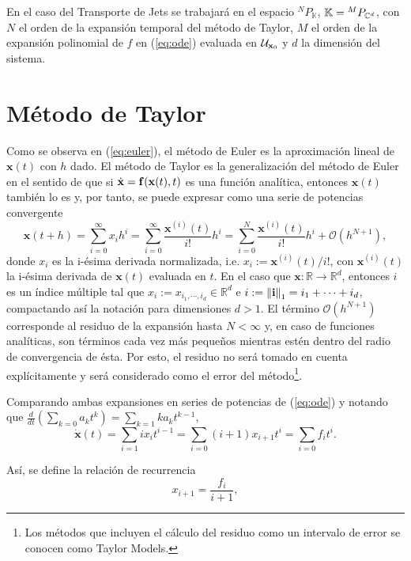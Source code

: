 En el caso del Transporte de Jets se trabajará en el espacio ${^{N}P_{\mathbb{K}}}$, $\mathbb{K} = {^{M}P_{\mathbb{C}^ d} }$, con $N$ el orden de la expansión temporal del método de Taylor, $M$ el orden de la expansión polinomial de $f$ en (\ref{eq:ode}) evaluada en $\mathcal{U}_{\mathbf{x}_0}$ y $d$ la dimensión del sistema. 

\section{Método de Taylor}
\label{sec:taylor-metodo}

Como se observa en (\ref{eq:euler}), el método de Euler es la aproximación lineal de $\mathbf{x}(t)$ con $h$ dado. El método de Taylor es la generalización del método de Euler en el sentido de que si $\dot{\mathbf{x}} = \mathbf{f}(\mathbf{x}(t),t)$ es una función analítica, entonces $\mathbf{x}(t)$ también lo es y, por tanto, se puede expresar como una serie de potencias convergente 
\begin{equation}
\mathbf{x}(t + h) = \sum_{i=0}^\infty x_i h^i = \sum_{i=0}^\infty \frac{\mathbf{x}^{(i)}(t)}{i!}h^i 
= \sum_{i=0}^N \frac{\mathbf{x}^{(i)}(t)}{i!}h^i + \mathcal{O}(h^{N+1}),
\label{eq:anal-exp}
\end{equation}
donde $x_i$ es la i-ésima derivada normalizada, i.e. $x_i  := \mathbf{x}^{(i)}(t)/i! $, con $\mathbf{x}^{(i)}(t)$ la i-ésima derivada de $\mathbf{x}(t)$ evaluada en $t$. En el caso que $\mathbf{x}: \mathbb{R} \to \mathbb{R}^d$, entonces $i$ es un índice múltiple tal que $x_i := x_{i_1,\cdots,i_d} \in \mathbb{R}^d$ e $i :=\left\lVert\mathbf{i}\right\rVert_1 = i_1 + \cdots + i_d$, compactando así la notación para dimensiones $d > 1$. El término $\mathcal{O}(h^{N+1})$ corresponde al residuo de la expansión hasta $N < \infty$ y, en caso de funciones analíticas, son términos cada vez más pequeños mientras estén dentro del radio de convergencia de ésta. Por esto, el residuo no será tomado en cuenta explícitamente y será considerado como el error del método\footnote{Los métodos que incluyen el cálculo del residuo como un intervalo de error se conocen como Taylor Models.}.

Comparando ambas expansiones en series de potencias de (\ref{eq:ode}) y notando que $ \frac{d}{dt} \left( \sum_{k=0} a_k t^k \right) = \sum_{k=1} k a_k t^{k-1}$,   
\begin{equation*}
 \dot{\mathbf{x}}(t) = \sum_{i=1} i x_i t^{i-1} = \sum_{i=0} (i+1)x_{i+1} t^i = \sum_{i=0} f_i t^i.
\end{equation*}

Así, se define la relación de recurrencia
\begin{equation}
x_{i+1} = \frac{f_i}{i+1},
\label{eq:rec-rel}
\end{equation}

